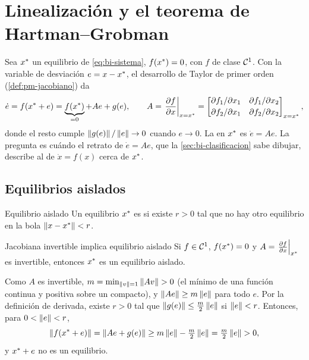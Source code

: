 \section{Linealización y el teorema de Hartman--Grobman}
\label{sec:bi-linealizacion}

Sea $x^{*}$ un equilibrio de \eqref{eq:bi-sistema}, $f(x^{*})=0$, con $f$ de clase $\mathcal{C}^{1}$. Con la variable de desviación $e=x-x^{*}$, el desarrollo de Taylor de primer orden (\cref{def:pm-jacobiano}) da
\begin{equation}
  \dot e=f(x^{*}+e)=\underbrace{f(x^{*})}_{=0}+Ae+g(e),\qquad
  A=\left.\frac{\partial f}{\partial x}\right|_{x=x^{*}}=\begin{bmatrix}\partial f_1/\partial x_1&\partial f_1/\partial x_2\\[2pt]\partial f_2/\partial x_1&\partial f_2/\partial x_2\end{bmatrix}_{x=x^{*}},
  \label{eq:bi-linealizacion}
\end{equation}
donde el resto cumple $\left\lVert g(e)\right\rVert/\left\lVert e\right\rVert\to0$ cuando $e\to0$. La  en $x^{*}$ es $\dot e=Ae$. La pregunta es cuándo el retrato de $\dot e=Ae$, que la \cref{sec:bi-clasificacion} sabe dibujar, describe al de $\dot x=f(x)$ cerca de $x^{*}$.

\subsection{Equilibrios aislados}

\begin{definicion}[label=def:bi-aislado]{Equilibrio aislado}
Un equilibrio $x^{*}$ es  si existe $r>0$ tal que no hay otro equilibrio en la bola $\left\lVert x-x^{*}\right\rVert<r$.
\end{definicion}

\begin{proposicion}[label=prop:bi-aislado]{Jacobiana invertible implica equilibrio aislado}
Si $f\in\mathcal{C}^{1}$, $f(x^{*})=0$ y $A=\left.\frac{\partial f}{\partial x}\right|_{x^{*}}$ es invertible, entonces $x^{*}$ es un equilibrio aislado.
\end{proposicion}

\begin{demostracion}
Como $A$ es invertible, $m=\min_{\left\lVert v\right\rVert=1}\left\lVert Av\right\rVert>0$ (el mínimo de una función continua y positiva sobre un compacto), y $\left\lVert Ae\right\rVert\ge m\left\lVert e\right\rVert$ para todo $e$. Por la definición de derivada, existe $r>0$ tal que $\left\lVert g(e)\right\rVert\le\tfrac m2\left\lVert e\right\rVert$ si $\left\lVert e\right\rVert<r$. Entonces, para $0<\left\lVert e\right\rVert<r$,
\[
  \left\lVert f(x^{*}+e)\right\rVert=\left\lVert Ae+g(e)\right\rVert\ge m\left\lVert e\right\rVert-\tfrac m2\left\lVert e\right\rVert=\tfrac m2\left\lVert e\right\rVert>0 ,
\]
y $x^{*}+e$ no es un equilibrio.
\end{demostracion}

